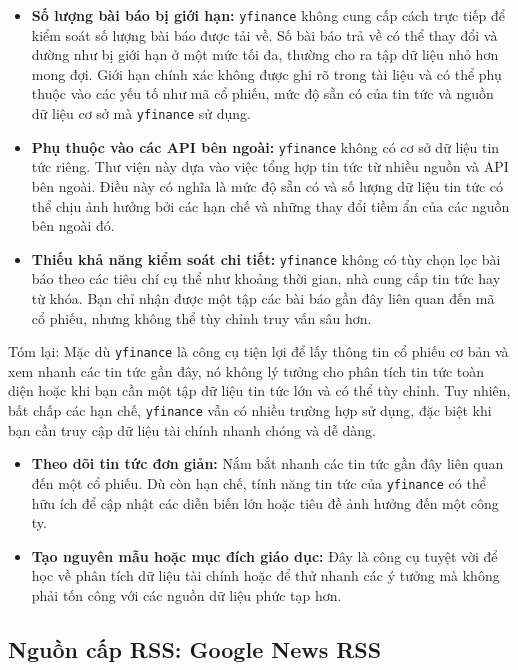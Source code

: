 \begin{itemize}
\item
  \textbf{Số lượng bài báo bị giới hạn:} \texttt{yfinance} không cung cấp cách trực tiếp để kiểm soát số lượng bài báo được tải về. Số bài báo trả về có thể thay đổi và dường như bị giới hạn ở một mức tối đa, thường cho ra tập dữ liệu nhỏ hơn mong đợi. Giới hạn chính xác không được ghi rõ trong tài liệu và có thể phụ thuộc vào các yếu tố như mã cổ phiếu, mức độ sẵn có của tin tức và nguồn dữ liệu cơ sở mà \texttt{yfinance} sử dụng.
\item
  \textbf{Phụ thuộc vào các API bên ngoài:} \texttt{yfinance} không có cơ sở dữ liệu tin tức riêng. Thư viện này dựa vào việc tổng hợp tin tức từ nhiều nguồn và API bên ngoài. Điều này có nghĩa là mức độ sẵn có và số lượng dữ liệu tin tức có thể chịu ảnh hưởng bởi các hạn chế và những thay đổi tiềm ẩn của các nguồn bên ngoài đó.
\item
  \textbf{Thiếu khả năng kiểm soát chi tiết:} \texttt{yfinance} không có tùy chọn lọc bài báo theo các tiêu chí cụ thể như khoảng thời gian, nhà cung cấp tin tức hay từ khóa. Bạn chỉ nhận được một tập các bài báo gần đây liên quan đến mã cổ phiếu, nhưng không thể tùy chỉnh truy vấn sâu hơn.
\end{itemize}

Tóm lại: Mặc dù \texttt{yfinance} là công cụ tiện lợi để lấy thông tin cổ phiếu cơ bản và xem nhanh các tin tức gần đây, nó không lý tưởng cho phân tích tin tức toàn diện hoặc khi bạn cần một tập dữ liệu tin tức lớn và có thể tùy chỉnh. Tuy nhiên, bất chấp các hạn chế, \texttt{yfinance} vẫn có nhiều trường hợp sử dụng, đặc biệt khi bạn cần truy cập dữ liệu tài chính nhanh chóng và dễ dàng.

\begin{itemize}
\item
  \textbf{Theo dõi tin tức đơn giản:} Nắm bắt nhanh các tin tức gần đây liên quan đến một cổ phiếu. Dù còn hạn chế, tính năng tin tức của \texttt{yfinance} có thể hữu ích để cập nhật các diễn biến lớn hoặc tiêu đề ảnh hưởng đến một công ty.
\item
  \textbf{Tạo nguyên mẫu hoặc mục đích giáo dục:} Đây là công cụ tuyệt vời để học về phân tích dữ liệu tài chính hoặc để thử nhanh các ý tưởng mà không phải tốn công với các nguồn dữ liệu phức tạp hơn.
\end{itemize}

\subsection{Nguồn cấp RSS: Google News RSS}

